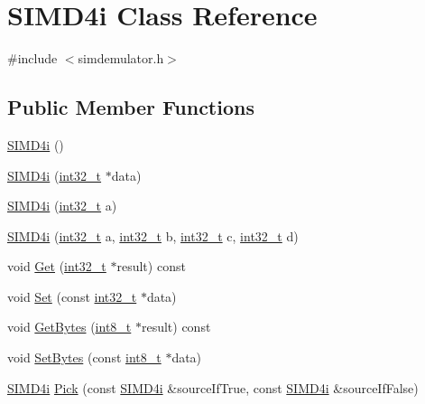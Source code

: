 \hypertarget{class_s_i_m_d4i}{}\section{S\+I\+M\+D4i Class Reference}
\label{class_s_i_m_d4i}


{\ttfamily \#include $<$simdemulator.\+h$>$}

\subsection*{Public Member Functions}
\begin{DoxyCompactItemize}
\item 
\hyperlink{class_s_i_m_d4i_aed962cf2d7cb1f3239fbaae17c54dfb3}{S\+I\+M\+D4i} ()
\item 
\hyperlink{class_s_i_m_d4i_a645ea294b27b8555ad83b9c03ece4044}{S\+I\+M\+D4i} (\hyperlink{simddefines_8h_ab1967d8591af1a4e48c37fd2b0f184d0}{int32\+\_\+t} $\ast$data)
\item 
\hyperlink{class_s_i_m_d4i_a0811d87d5b92aa2c8b545ff4eed23667}{S\+I\+M\+D4i} (\hyperlink{simddefines_8h_ab1967d8591af1a4e48c37fd2b0f184d0}{int32\+\_\+t} a)
\item 
\hyperlink{class_s_i_m_d4i_a9ccdff6cad45fd026d7815a82fdbd3c0}{S\+I\+M\+D4i} (\hyperlink{simddefines_8h_ab1967d8591af1a4e48c37fd2b0f184d0}{int32\+\_\+t} a, \hyperlink{simddefines_8h_ab1967d8591af1a4e48c37fd2b0f184d0}{int32\+\_\+t} b, \hyperlink{simddefines_8h_ab1967d8591af1a4e48c37fd2b0f184d0}{int32\+\_\+t} c, \hyperlink{simddefines_8h_ab1967d8591af1a4e48c37fd2b0f184d0}{int32\+\_\+t} d)
\item 
void \hyperlink{class_s_i_m_d4i_a7f212da9b94db04c3f146af7a139d9ba}{Get} (\hyperlink{simddefines_8h_ab1967d8591af1a4e48c37fd2b0f184d0}{int32\+\_\+t} $\ast$result) const 
\item 
void \hyperlink{class_s_i_m_d4i_a5fa89cf5be6321da68dd0410d2c78877}{Set} (const \hyperlink{simddefines_8h_ab1967d8591af1a4e48c37fd2b0f184d0}{int32\+\_\+t} $\ast$data)
\item 
void \hyperlink{class_s_i_m_d4i_a5ae9dad273cdb5a7a63ba7c83880c314}{Get\+Bytes} (\hyperlink{simddefines_8h_aef44329758059c91c76d334e8fc09700}{int8\+\_\+t} $\ast$result) const 
\item 
void \hyperlink{class_s_i_m_d4i_a9d606d120af4f52ba32407e970000060}{Set\+Bytes} (const \hyperlink{simddefines_8h_aef44329758059c91c76d334e8fc09700}{int8\+\_\+t} $\ast$data)
\item 
\hyperlink{class_s_i_m_d4i}{S\+I\+M\+D4i} \hyperlink{class_s_i_m_d4i_ad78f06818f79a43994e4f4cb7339f5ea}{Pick} (const \hyperlink{class_s_i_m_d4i}{S\+I\+M\+D4i} \&source\+If\+True, const \hyperlink{class_s_i_m_d4i}{S\+I\+M\+D4i} \&source\+If\+False)

\end{DoxyCompactItemize}
